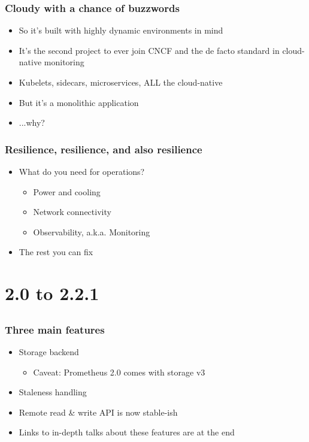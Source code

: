 \documentclass[t]{beamer}
\begin{document}
\begin{frame}
	\frametitle{Cloudy with a chance of buzzwords}
	\begin{itemize}
		\item So it's built with highly dynamic environments in mind
		\item It's the second project to ever join CNCF and the de facto standard in cloud-native monitoring
		\item Kubelets, sidecars, microservices, ALL the cloud-native
		\vfill
		\item But it's a monolithic application
		\vfill
		\item ...why?
	\end{itemize}
\end{frame}

\begin{frame}
	\frametitle{Resilience, resilience, and also resilience}
	\begin{itemize}
		\item What do you need for operations?
		\begin{itemize}
			\item Power and cooling
			\item Network connectivity
			\item Observability, a.k.a. Monitoring
		\end{itemize}
		\item The rest you can fix
	\end{itemize}
\end{frame}


\section{2.0 to 2.2.1}
\subsection{}

\begin{frame}
	\frametitle{Three main features}
	\begin{itemize}
		\item Storage backend
		\begin{itemize}
			\item Caveat: Prometheus 2.0 comes with storage v3
		\end{itemize}
		\item Staleness handling
		\item Remote read \& write API is now stable-ish
		\item Links to in-depth talks about these features are at the end
	\end{itemize}
\end{frame}
\end{document}
